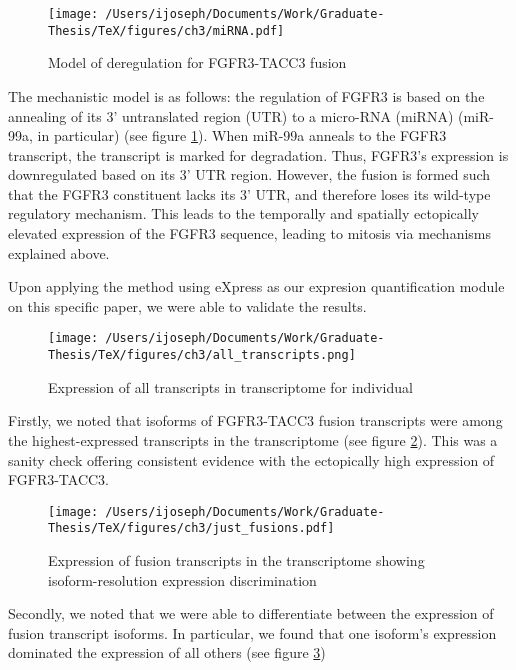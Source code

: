 \begin{figure}
  \centering \texttt{[image: /Users/ijoseph/Documents/Work/Graduate-Thesis/TeX/figures/ch3/miRNA.pdf]}
  \caption{Model of deregulation for FGFR3-TACC3
    fusion} \label{threeone}
\end{figure}


The mechanistic model is as follows: the regulation of FGFR3 is based on the annealing of its 3' untranslated region (UTR) to a micro-RNA (miRNA) (miR-99a, in particular) (see figure \ref{threeone}). When miR-99a anneals to the FGFR3 transcript, the transcript is marked for degradation. Thus, FGFR3's expression is downregulated based on its 3' UTR region. However, the fusion is formed such that the FGFR3 constituent lacks its 3' UTR, and therefore loses its wild-type regulatory mechanism. This leads to the temporally and spatially ectopically elevated expression of the FGFR3 sequence, leading to mitosis via mechanisms explained above.


Upon applying the method using eXpress as our expresion quantification module\cite{roberts_streaming_2013} on this specific paper, we were able to validate the results.

\begin{figure}
  \centering \texttt{[image: /Users/ijoseph/Documents/Work/Graduate-Thesis/TeX/figures/ch3/all\_transcripts.png]}
  \caption{Expression of all transcripts in transcriptome for
    individual} \label{threetwo}
\end{figure}


Firstly, we noted that isoforms of FGFR3-TACC3 fusion transcripts were among the highest-expressed transcripts in the transcriptome (see figure \ref{threetwo}). This was a sanity check offering consistent evidence with the ectopically high expression of FGFR3-TACC3.


\begin{figure}
  \centering \texttt{[image: /Users/ijoseph/Documents/Work/Graduate-Thesis/TeX/figures/ch3/just\_fusions.pdf]}
  \caption{Expression of fusion transcripts in the transcriptome showing isoform-resolution expression discrimination} \label{threethree}
\end{figure}



Secondly, we noted that we were able to differentiate between the expression of fusion transcript isoforms. In particular, we found that one isoform's expression dominated the expression of all others (see figure \ref{threethree})



